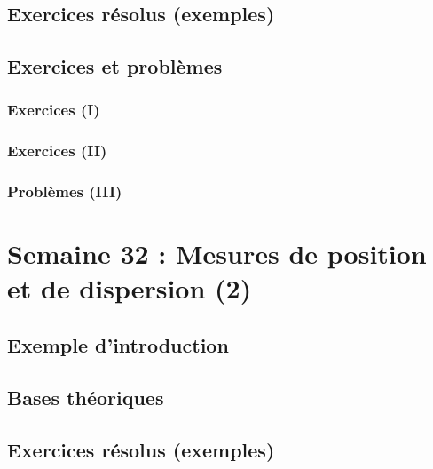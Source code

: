 \documentclass[
  12pt,
]{book}
\begin{document}
\hypertarget{exercices-ruxe9solus-exemples-30}{%
\section{Exercices résolus (exemples)}\label{exercices-ruxe9solus-exemples-30}}

\hypertarget{exercices-et-probluxe8mes-30}{%
\section{Exercices et problèmes}\label{exercices-et-probluxe8mes-30}}

\hypertarget{exercices-i-30}{%
\subsection{Exercices (I)}\label{exercices-i-30}}

\hypertarget{exercices-ii-30}{%
\subsection{Exercices (II)}\label{exercices-ii-30}}

\hypertarget{probluxe8mes-iii-30}{%
\subsection{Problèmes (III)}\label{probluxe8mes-iii-30}}

\hypertarget{semaine-32-mesures-de-position-et-de-dispersion-2}{%
\chapter{Semaine 32 : Mesures de position et de dispersion (2)}\label{semaine-32-mesures-de-position-et-de-dispersion-2}}

\hypertarget{exemple-dintroduction-31}{%
\section{Exemple d'introduction}\label{exemple-dintroduction-31}}

\hypertarget{bases-thuxe9oriques-31}{%
\section{Bases théoriques}\label{bases-thuxe9oriques-31}}

\hypertarget{exercices-ruxe9solus-exemples-31}{%
\section{Exercices résolus (exemples)}\label{exercices-ruxe9solus-exemples-31}}
\end{document}
